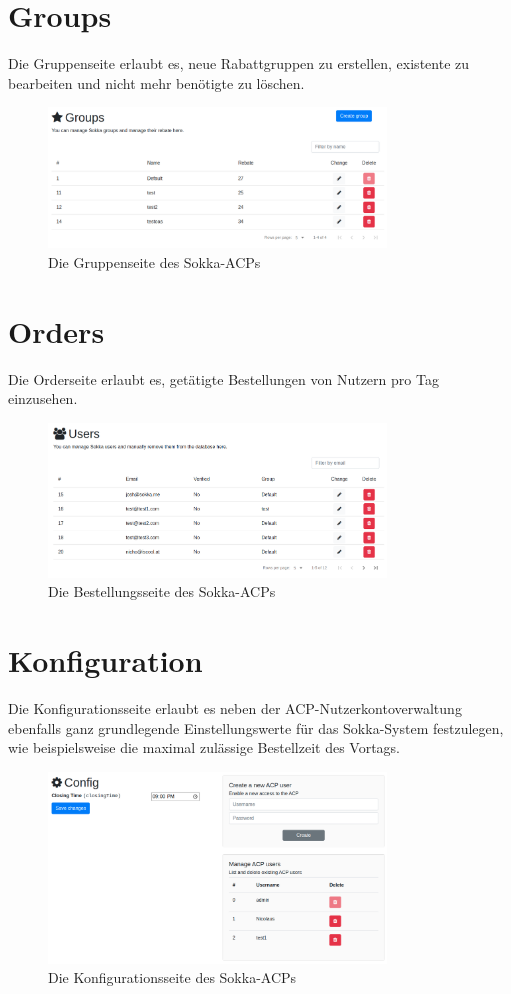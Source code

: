 \section{Groups}

Die Gruppenseite erlaubt es, neue Rabattgruppen zu erstellen, existente zu bearbeiten und nicht mehr benötigte zu löschen.

\begin{figure}[ht]
    \centering
    \includegraphics[width=0.8\textwidth]{images/ACP/groups.png}
    \caption{Die Gruppenseite des Sokka-ACPs}
\end{figure}

\section{Orders}

Die Orderseite erlaubt es, getätigte Bestellungen von Nutzern pro Tag einzusehen.

\begin{figure}[ht]
    \centering
    \includegraphics[width=0.8\textwidth]{images/ACP/users-page.png}
    \caption{Die Bestellungsseite des Sokka-ACPs}
\end{figure}

\section{Konfiguration}

Die Konfigurationsseite erlaubt es neben der ACP-Nutzerkontoverwaltung ebenfalls ganz grundlegende Einstellungswerte für das Sokka-System festzulegen, wie beispielsweise die maximal zulässige Bestellzeit des Vortags.

\begin{figure}[ht]
    \centering
    \includegraphics[width=0.8\textwidth]{images/ACP/config.png}
    \caption{Die Konfigurationsseite des Sokka-ACPs}
\end{figure}